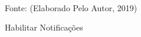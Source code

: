 \begin{figure}[!htpb]
	\centering
	\caption{Habilitar Notificações}
	\\
	{\footnotesize Fonte: (Elaborado Pelo Autor, 2019)}
	\label{notificacao}
\end{figure}

